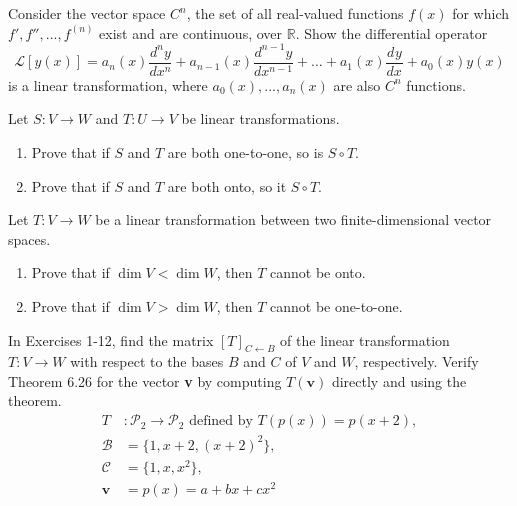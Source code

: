 \documentclass[12pt,letterpaper]{hmcpset}
\newcommand{\RR}{\mathbb{R}}
\newcommand{\df}[3]{\frac{d^{#1}#2}{d#3^{#1}}}
\begin{document}

\begin{problem}
    Consider the vector space $C^n$, the set of all real-valued
    functions $f(x)$ for which $f',f'',...,f^{(n)}$ exist and are
    continuous, over $\RR$. Show the differential operator
    \[
        \mathcal{L}[y(x)]=a_n(x)\df{n}{y}{x}+a_{n-1}(x)\df{n-1}{y}{x}+
        \dots+a_1(x)\df{}{y}{x}+a_0(x)y(x)
    \]
    is a linear transformation, where $a_0(x),...,a_n(x)$ are also
    $C^n$ functions.
\end{problem}
\begin{solution}
    \vfill
\end{solution}
\newpage

\begin{problem}[6.5.33]
    Let $S:V\to W$ and $T:U\to V$ be linear transformations.
    \begin{enumerate}
        \item Prove that if $S$ and $T$ are both one-to-one, so is $S\circ T$.
        \item Prove that if $S$ and $T$ are both onto, so it $S\circ T$.
    \end{enumerate}
\end{problem}
\begin{solution}
    \vfill
\end{solution}
\newpage

\begin{problem}[6.5.35]
    Let $T:V\to W$ be a linear transformation between two
    finite-dimensional vector spaces.
    \begin{enumerate}
        \item Prove that if $\dim V<\dim W$, then $T$ cannot be onto.
        \item Prove that if $\dim V>\dim W$, then $T$ cannot be one-to-one.
    \end{enumerate}
\end{problem}
\begin{solution}
    \vfill
\end{solution}
\newpage

\begin{problem}[6.6.4]
    In Exercises 1-12, find the matrix $[T]_{C\leftarrow B}$ of the
    linear transformation $T:V\to W$ with respect to the bases $B$ and
    $C$ of $V$ and $W$, respectively. Verify Theorem 6.26 for the
    vector \textbf{v} by computing $T(\textbf{v})$ directly and using
    the theorem.
    \begin{align*}
        T&:\mathscr{P}_2\to\mathscr{P}_2\text{ defined by }T(p(x))=p(x+2),\\
        \mathcal{B}&=\{1,x+2,(x+2)^2\},\\\mathcal{C}&=\{1,x,x^2\},\\
        \textbf{v}&=p(x)=a+bx+cx^2
    \end{align*}
\end{problem}
\begin{solution}
    \vfill
\end{solution}
\newpage
\end{document}
